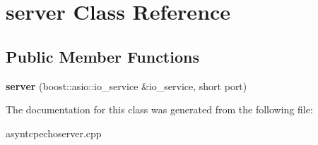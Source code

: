 \hypertarget{classserver}{}\section{server Class Reference}
\label{classserver}
\subsection*{Public Member Functions}
\begin{DoxyCompactItemize}
\item 
\mbox{\label{classserver_add3cc1b2c469ccade459882d335e369f}} 
{\bfseries server} (boost\+::asio\+::io\+\_\+service \&io\+\_\+service, short port)
\end{DoxyCompactItemize}


The documentation for this class was generated from the following file\+:\begin{DoxyCompactItemize}
\item 
asyntcpechoserver.\+cpp\end{DoxyCompactItemize}
